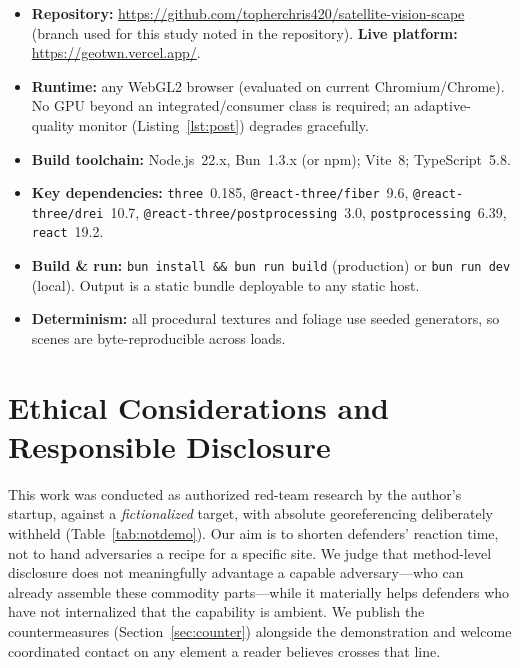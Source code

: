 \documentclass[conference]{IEEEtran}
\begin{document}
\begin{itemize}
\item \textbf{Repository:} \url{https://github.com/topherchris420/satellite-vision-scape}
(branch used for this study noted in the repository). \textbf{Live platform:}
\url{https://geotwn.vercel.app/}.
\item \textbf{Runtime:} any WebGL2 browser (evaluated on current Chromium/Chrome).
No GPU beyond an integrated/consumer class is required; an adaptive-quality monitor
(Listing~\ref{lst:post}) degrades gracefully.
\item \textbf{Build toolchain:} Node.js~22.x, Bun~1.3.x (or npm); Vite~8;
TypeScript~5.8.
\item \textbf{Key dependencies:} \texttt{three}~0.185, \texttt{@react-three/fiber}~9.6,
\texttt{@react-three/drei}~10.7, \texttt{@react-three/postprocessing}~3.0,
\texttt{postprocessing}~6.39, \texttt{react}~19.2.
\item \textbf{Build \& run:} \texttt{bun install \&\& bun run build} (production)
or \texttt{bun run dev} (local). Output is a static bundle deployable to any
static host.
\item \textbf{Determinism:} all procedural textures and foliage use seeded
generators, so scenes are byte-reproducible across loads.
\end{itemize}

\section{Ethical Considerations and Responsible Disclosure}
\label{sec:ethics}
This work was conducted as authorized red-team research by the author's startup,
against a \emph{fictionalized} target, with absolute georeferencing deliberately
withheld (Table~\ref{tab:notdemo}). Our aim is to shorten defenders' reaction time,
not to hand adversaries a recipe for a specific site. We judge that method-level
disclosure does not meaningfully advantage a capable adversary---who can already
assemble these commodity parts---while it materially helps defenders who have not
internalized that the capability is ambient. We publish the countermeasures
(Section~\ref{sec:counter}) alongside the demonstration and welcome coordinated
contact on any element a reader believes crosses that line.

\end{document}
